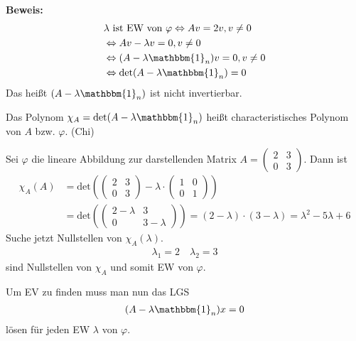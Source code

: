 \textbf{Beweis:}
\begin{align*}
	&\lambda\text{ ist EW von }\varphi \Leftrightarrow Av = 2v, v \neq 0 \\
	&\Leftrightarrow Av - \lambda v = 0, v \neq 0 \\
	&\Leftrightarrow (A - \lambda \mathbbm{1}_n)v = 0, v \neq 0 \\
	&\Leftrightarrow \text{det}(A - \lambda \mathbbm{1}_n) = 0
\end{align*}
Das heißt $(A - \lambda \mathbbm{1}_n)$ ist nicht invertierbar.

Das Polynom $\chi_A = \text{det}(A - \lambda \mathbbm{1}_n)$ heißt characteristisches Polynom von $A$ bzw. $\varphi$. (Chi)

Sei $\varphi$ die lineare Abbildung zur darstellenden Matrix $A = \begin{pmatrix}2 & 3 \\ 0 & 3\end{pmatrix}$. Dann ist
\begin{align*}
	\chi_A(A) &= \text{det}\left(\begin{pmatrix}2 & 3 \\ 0 & 3\end{pmatrix} - \lambda\cdot\begin{pmatrix}1 & 0 \\ 0 & 1\end{pmatrix}\right) \\
	&= \text{det}\left(\begin{pmatrix}2-\lambda & 3 \\ 0 & 3-\lambda\end{pmatrix}\right) = (2-\lambda)\cdot(3-\lambda) = \lambda^2 - 5\lambda + 6
\end{align*}
Suche jetzt Nullstellen von $\chi_A(\lambda)$.
\begin{align*}
	\lambda_1 = 2\quad\lambda_2 = 3
\end{align*}
sind Nullstellen von $\chi_A$ und somit EW von $\varphi$.

Um EV zu finden muss man nun das LGS
\begin{align*}
	(A - \lambda\mathbbm{1}_n)x = 0
\end{align*}
lösen für jeden EW $\lambda$ von $\varphi$.

